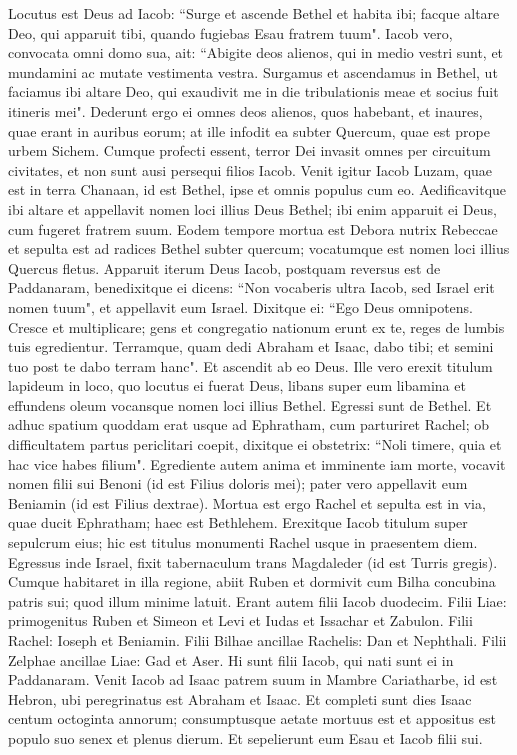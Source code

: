 \begin{biblechapter}  
\verse Locutus est Deus ad Iacob: “Surge et ascende Bethel et habita ibi; facque altare Deo, qui apparuit tibi, quando fugiebas Esau fratrem tuum". 
\verse Iacob vero, convocata omni domo sua, ait: “Abigite deos alienos, qui in medio vestri sunt, et mundamini ac mutate vestimenta vestra. 
\verse Surgamus et ascendamus in Bethel, ut faciamus ibi altare Deo, qui exaudivit me in die tribulationis meae et socius fuit itineris mei". 
\verse Dederunt ergo ei omnes deos alienos, quos habebant, et inaures, quae erant in auribus eorum; at ille infodit ea subter Quercum, quae est prope urbem Sichem. 
\verse Cumque profecti essent, terror Dei invasit omnes per circuitum civitates, et non sunt ausi persequi filios Iacob. 
\verse Venit igitur Iacob Luzam, quae est in terra Chanaan, id est Bethel, ipse et omnis populus cum eo. 
\verse Aedificavitque ibi altare et appellavit nomen loci illius Deus Bethel; ibi enim apparuit ei Deus, cum fugeret fratrem suum. 
\verse Eodem tempore mortua est Debora nutrix Rebeccae et sepulta est ad radices Bethel subter quercum; vocatumque est nomen loci illius Quercus fletus. 
\verse Apparuit iterum Deus Iacob, postquam reversus est de Paddanaram, benedixitque ei 
\verse dicens: “Non vocaberis ultra Iacob, sed Israel erit nomen tuum", et appellavit eum Israel. 
\verse Dixitque ei: “Ego Deus omnipotens. Cresce et multiplicare; gens et congregatio nationum erunt ex te, reges de lumbis tuis egredientur. 
\verse Terramque, quam dedi Abraham et Isaac, dabo tibi; et semini tuo post te dabo terram hanc". 
\verse Et ascendit ab eo Deus. 
\verse Ille vero erexit titulum lapideum in loco, quo locutus ei fuerat Deus, libans super eum libamina et effundens oleum 
\verse vocansque nomen loci illius Bethel. 
\verse Egressi sunt de Bethel. Et adhuc spatium quoddam erat usque ad Ephratham, cum parturiret Rachel; 
\verse ob difficultatem partus periclitari coepit, dixitque ei obstetrix: “Noli timere, quia et hac vice habes filium". 
\verse Egrediente autem anima et imminente iam morte, vocavit nomen filii sui Benoni (id est Filius doloris mei); pater vero appellavit eum Beniamin (id est Filius dextrae). 
\verse Mortua est ergo Rachel et sepulta est in via, quae ducit Ephratham; haec est Bethlehem. 
\verse Erexitque Iacob titulum super sepulcrum eius; hic est titulus monumenti Rachel usque in praesentem diem. 
\verse Egressus inde Israel, fixit tabernaculum trans Magdaleder (id est Turris gregis). 
\verse Cumque habitaret in illa regione, abiit Ruben et dormivit cum Bilha concubina patris sui; quod illum minime latuit. Erant autem filii Iacob duodecim. 
\verse Filii Liae: primogenitus Ruben et Simeon et Levi et Iudas et Issachar et Zabulon. 
\verse Filii Rachel: Ioseph et Beniamin. 
\verse Filii Bilhae ancillae Rachelis: Dan et Nephthali. 
\verse Filii Zelphae ancillae Liae: Gad et Aser. Hi sunt filii Iacob, qui nati sunt ei in Paddanaram. 
\verse Venit Iacob ad Isaac patrem suum in Mambre Cariatharbe, id est Hebron, ubi peregrinatus est Abraham et Isaac. 
\verse Et completi sunt dies Isaac centum octoginta annorum; 
\verse consumptusque aetate mortuus est et appositus est populo suo senex et plenus dierum. Et sepelierunt eum Esau et Iacob filii sui. 
\end{biblechapter}

